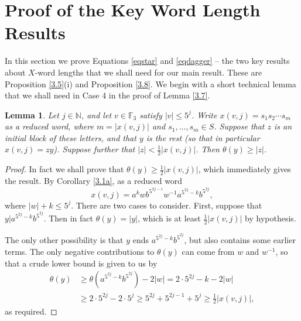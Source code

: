 \documentclass[twoside,11pt]{amsart}
\numberwithin{equation}{section}
\newtheorem{lemma}[theorem]{Lemma}
\theoremstyle{definition}
\newcommand {\N}{\mathbb N}
\newcommand{\1}{\mathbbm{1}}
\newcommand{\F}{\mathbb F}
\newcommand{\ubar}[1]{\text{\b{$#1$}}}
\begin{document}
	
	

	




	
	\section{Proof of the Key Word Length Results}
	\noindent	
	In this section we prove Equations \eqref{eqstar} and \eqref{eqdagger} -- the two key results about $X$-word lengths that we shall need for our main result. These are Proposition \ref{3.5}(i) and Proposition \ref{3.8}. 
	We begin with a short technical lemma that we shall need in Case 4 in the proof of Lemma \ref{3.7}.
	
	
	\begin{lemma}		\label{3.6}
		Let $j \in \N$, and let $v \in \F_3$ satisfy $|v| \leq 5^j$. Write 
		$x(v,j) = s_1s_2 \cdots s_m$ as a reduced word, where $m = |x(v,j)|$ and $s_1, \ldots, s_m \in S$.
		Suppose that $z$ is an initial block of these letters, and that $y$ is the rest (so that in particular $x(v,j) = zy$).
		Suppose further that $|z| < \frac{1}{2} |x(v,j)|$. Then $\theta(y) \geq |z|$. 
	\end{lemma}
	
	\begin{proof}
		In fact we shall prove that $\theta(y) \geq \frac{1}{2} |x(v,j)|$, which immediately gives the result. 
		By Corollary \ref{3.1a}, as a reduced word 
		$$x(v,j) = a^k w b^{5^{2j-1}} w^{-1} a^{5^{2j} - k} b^{5^{2j}}, $$
		where $|w|+ k \leq 5^j$.
		There are two cases to consider.		
		First, suppose that $y|a^{5^{2j}-k}b^{5^{2j}}$.
		Then in fact $\theta(y) = |y|$, which is at least 
		$\frac{1}{2} |x(v,j)|$ by hypothesis.
		
		The only other possibility is that $y$ ends  
		$a^{5^{2j}-k}b^{5^{2j}}$, but also contains some earlier terms. The only negative contributions to $\theta(y)$ can come from $w$ and $w^{-1}$, so that a crude lower bound is given to us by
		\begin{align*}
			\theta(y) &\geq \theta(a^{5^{2j}-k}b^{5^{2j}}) - 2|w| = 2\cdot 5^{2j} -k - 2|w| \\
			&\geq 2 \cdot 5^{2j} - 2\cdot 5^j \geq 5^{2j} + 5^{2j-1} + 5^j 
			\geq \tfrac{1}{2} |x(v,j)|,
		\end{align*}
		as required.
	\end{proof}
	
\end{document}
